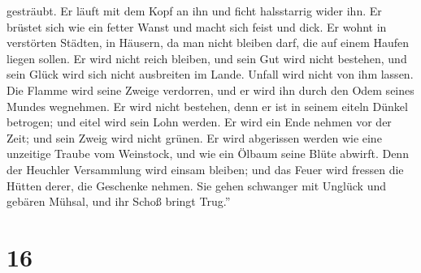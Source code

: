 gesträubt.  Er läuft mit dem Kopf an ihn und ficht
halsstarrig wider ihn.  Er brüstet sich wie ein fetter
Wanst und macht sich feist und dick.  Er wohnt in
verstörten Städten, in Häusern, da man nicht bleiben darf, die auf einem
Haufen liegen sollen.  Er wird nicht reich bleiben, und
sein Gut wird nicht bestehen, und sein Glück wird sich nicht ausbreiten
im Lande.  Unfall wird nicht von ihm lassen. Die Flamme
wird seine Zweige verdorren, und er wird ihn durch den Odem seines
Mundes wegnehmen.  Er wird nicht bestehen, denn er ist in
seinem eiteln Dünkel betrogen; und eitel wird sein Lohn werden.
 Er wird ein Ende nehmen vor der Zeit; und sein Zweig wird
nicht grünen.  Er wird abgerissen werden wie eine unzeitige
Traube vom Weinstock, und wie ein Ölbaum seine Blüte abwirft.
 Denn der Heuchler Versammlung wird einsam bleiben; und das
Feuer wird fressen die Hütten derer, die Geschenke nehmen. 
Sie gehen schwanger mit Unglück und gebären Mühsal, und ihr Schoß bringt
Trug.''

\hypertarget{section-15}{%
\section{16}\label{section-15}}

